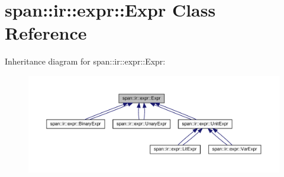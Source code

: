 \hypertarget{classspan_1_1ir_1_1expr_1_1Expr}{}\section{span\+:\+:ir\+:\+:expr\+:\+:Expr Class Reference}
\label{classspan_1_1ir_1_1expr_1_1Expr}


Inheritance diagram for span\+:\+:ir\+:\+:expr\+:\+:Expr\+:\nopagebreak
\begin{figure}[H]
\begin{center}
\leavevmode
\includegraphics[width=350pt]{classspan_1_1ir_1_1expr_1_1Expr__inherit__graph}
\end{center}
\end{figure}
